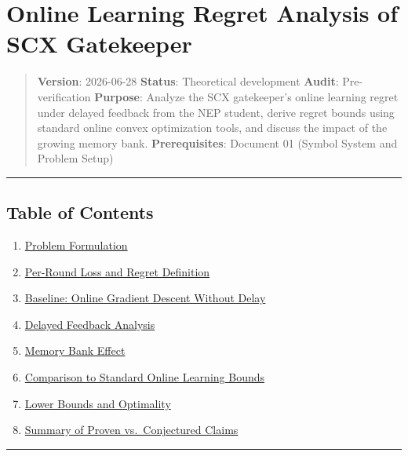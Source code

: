 \documentclass[
  12pt,
]{ctexart}
\author{SCX}
\date{2026}
\providecommand{\tightlist}{%
  \setlength{\itemsep}{0pt}\setlength{\parskip}{0pt}}
\begin{document}
\section{Online Learning Regret Analysis of SCX
Gatekeeper}\label{online-learning-regret-analysis-of-scx-gatekeeper}

\begin{quote}
\textbf{Version}: 2026-06-28 \textbar{} \textbf{Status}: Theoretical
development \textbar{} \textbf{Audit}: Pre-verification
\textbf{Purpose}: Analyze the SCX gatekeeper's online learning regret
under delayed feedback from the NEP student, derive regret bounds using
standard online convex optimization tools, and discuss the impact of the
growing memory bank. \textbf{Prerequisites}: Document 01 (Symbol System
and Problem Setup)
\end{quote}

\begin{center}\rule{0.5\linewidth}{0.5pt}\end{center}

\subsection{Table of Contents}\label{table-of-contents}

\begin{enumerate}
\def\labelenumi{\arabic{enumi}.}
\tightlist
\item
  \hyperref[1-problem-formulation]{Problem Formulation}
\item
  \hyperref[2-per-round-loss-and-regret-definition]{Per-Round Loss and
  Regret Definition}
\item
  \hyperref[3-baseline-online-gradient-descent-without-delay]{Baseline:
  Online Gradient Descent Without Delay}
\item
  \hyperref[4-delayed-feedback-analysis]{Delayed Feedback Analysis}
\item
  \hyperref[5-memory-bank-effect]{Memory Bank Effect}
\item
  \hyperref[6-comparison-to-standard-online-learning-bounds]{Comparison
  to Standard Online Learning Bounds}
\item
  \hyperref[7-lower-bounds-and-optimality]{Lower Bounds and Optimality}
\item
  \hyperref[8-summary-of-proven-vs-conjectured-claims]{Summary of Proven
  vs.~Conjectured Claims}
\end{enumerate}

\begin{center}\rule{0.5\linewidth}{0.5pt}\end{center}
\end{document}

